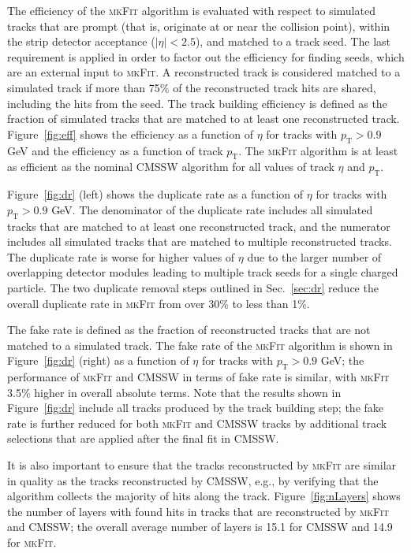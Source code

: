 \documentclass[a4paper,11pt]{article}
\newcommand{\mkFit}{\textsc{mkFit}\xspace}
\begin{document}
The efficiency of the \mkFit algorithm is evaluated with respect to simulated tracks that are prompt (that is, originate at or near the collision point), within the strip detector acceptance ($|\eta|<2.5$), and matched to a track seed. The last requirement is applied in order to factor out the efficiency for finding seeds, which are an external input to \mkFit. A reconstructed track is considered matched to a simulated track if more than 75\% of the reconstructed track hits are shared, including the hits from the seed. The track building efficiency is defined as the fraction of simulated tracks that are matched to at least one reconstructed track. Figure~\ref{fig:eff} shows the efficiency as a function of $\eta$ for tracks with $p_\mathrm{T} > 0.9$ GeV and the efficiency as a function of track $p_\mathrm{T}$. The \mkFit algorithm is at least as efficient as the nominal CMSSW algorithm for all values of track $\eta$ and $p_\mathrm{T}$.

Figure~\ref{fig:dr} (left) shows the duplicate rate as a function of $\eta$ for tracks with $p_\mathrm{T} > 0.9$ GeV.
 The denominator of the duplicate rate includes all simulated tracks that are matched to at least one reconstructed track, and the numerator includes all simulated tracks that are matched to multiple reconstructed tracks.
 The duplicate rate is worse for higher values of $\eta$ due to the larger number of overlapping detector modules leading to multiple track seeds for a single charged particle. The two duplicate removal steps outlined in Sec.~\ref{sec:dr} reduce the overall duplicate rate in \mkFit from over 30\% to less than 1\%.
 
The fake rate is defined as the fraction of reconstructed tracks that are not matched to a simulated track. The fake rate of the \mkFit algorithm is shown in Figure~\ref{fig:dr} (right) as a function of $\eta$ for tracks with $p_\mathrm{T} > 0.9$ GeV; the performance of \mkFit and CMSSW in terms of fake rate is similar, with \mkFit 3.5\% higher in overall absolute terms.
Note that the results shown in Figure~\ref{fig:dr} include all tracks produced by the track building step; the fake rate is further reduced for both \mkFit and CMSSW tracks by additional track selections that are applied after the final fit in CMSSW. 

It is also important to ensure that the tracks reconstructed by \mkFit are similar in quality as the tracks reconstructed by CMSSW, e.g., by verifying that the algorithm collects the majority of hits along the track. Figure~\ref{fig:nLayers} shows the number of layers with found hits in tracks that are reconstructed by \mkFit and CMSSW; the overall average number of layers is 15.1 for CMSSW and 14.9 for \mkFit.
\end{document}
